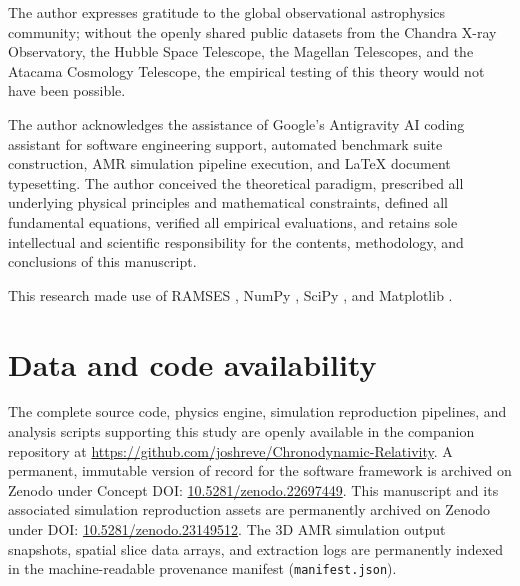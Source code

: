 \documentclass[aps,prd,reprint,superscriptaddress,nofootinbib,floatfix,amsmath,amssymb]{revtex4-2}
\begin{document}
\begin{acknowledgments}
The author expresses gratitude to the global observational astrophysics community; without the openly shared public datasets from the Chandra X-ray Observatory, the Hubble Space Telescope, the Magellan Telescopes, and the Atacama Cosmology Telescope, the empirical testing of this theory would not have been possible.

The author acknowledges the assistance of Google's Antigravity AI coding assistant for software engineering support, automated benchmark suite construction, AMR simulation pipeline execution, and \LaTeX{} document typesetting. The author conceived the theoretical paradigm, prescribed all underlying physical principles and mathematical constraints, defined all fundamental equations, verified all empirical evaluations, and retains sole intellectual and scientific responsibility for the contents, methodology, and conclusions of this manuscript.

This research made use of \textsc{RAMSES} \cite{Teyssier2002_RAMSES}, NumPy \cite{numpy2020}, SciPy \cite{scipy2020}, and Matplotlib \cite{matplotlib2007}.
\end{acknowledgments}

\section*{Data and code availability}
The complete source code, physics engine, simulation reproduction pipelines, and analysis scripts supporting this study are openly available in the companion repository \cite{shreve_chronodynamic_2026} at \url{https://github.com/joshreve/Chronodynamic-Relativity}. A permanent, immutable version of record for the software framework is archived on Zenodo under Concept DOI: \href{https://doi.org/10.5281/zenodo.22697449}{10.5281/zenodo.22697449}. This manuscript and its associated simulation reproduction assets are permanently archived on Zenodo under DOI: \href{https://doi.org/10.5281/zenodo.23149512}{10.5281/zenodo.23149512}. The 3D AMR simulation output snapshots, spatial slice data arrays, and extraction logs are permanently indexed in the machine-readable provenance manifest (\texttt{manifest.json}).


\end{document}
